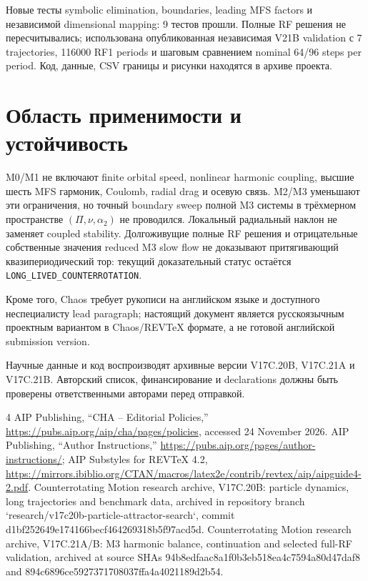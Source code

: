 \documentclass[aip,cha,reprint,amsmath,amssymb]{revtex4-2}
\begin{document}
Новые тесты symbolic elimination, boundaries, leading MFS factors и независимой dimensional mapping: 9 тестов прошли. Полные RF решения не пересчитывались; использована опубликованная независимая V21B validation с 7 trajectories, 116000 RF1 periods и шаговым сравнением nominal 64/96 steps per period. Код, данные, CSV границы и рисунки находятся в архиве проекта.

\section{Область применимости и устойчивость}
M0/M1 не включают finite orbital speed, nonlinear harmonic coupling, высшие шесть MFS гармоник, Coulomb, radial drag и осевую связь. M2/M3 уменьшают эти ограничения, но точный boundary sweep полной M3 системы в трёхмерном пространстве $(\Pi,\nu,\alpha_2)$ не проводился. Локальный радиальный наклон не заменяет coupled stability. Долгоживущие полные RF решения и отрицательные собственные значения reduced M3 slow flow не доказывают притягивающий квазипериодический тор: текущий доказательный статус остаётся \texttt{LONG\_LIVED\_COUNTERROTATION}.

Кроме того, Chaos требует рукописи на английском языке и доступного неспециалисту lead paragraph; настоящий документ является русскоязычным проектным вариантом в Chaos/REVTeX формате, а не готовой английской submission version.\cite{chaosguide,revtexguide,v20barchive,v21archive}

\begin{acknowledgments}
Научные данные и код воспроизводят архивные версии V17C.20B, V17C.21A и V17C.21B. Авторский список, финансирование и declarations должны быть проверены ответственными авторами перед отправкой.
\end{acknowledgments}

\begin{thebibliography}{4}
 AIP Publishing, ``CHA -- Editorial Policies,'' \url{https://pubs.aip.org/aip/cha/pages/policies}, accessed 24 November 2026.
 AIP Publishing, ``Author Instructions,'' \url{https://pubs.aip.org/pages/author-instructions/}; AIP Substyles for REVTeX 4.2, \url{https://mirrors.ibiblio.org/CTAN/macros/latex2e/contrib/revtex/aip/aipguide4-2.pdf}.
 Counterrotating Motion research archive, V17C.20B: particle dynamics, long trajectories and benchmark data, archived in repository branch `research/v17c20b-particle-attractor-search`, commit d1bf252649e174166becf464269318b5f97acd5d.
 Counterrotating Motion research archive, V17C.21A/B: M3 harmonic balance, continuation and selected full-RF validation, archived at source SHAs 94b8edfaac8a1f0b3eb518ea4c7594a80d47daf8 and 894c6896ce5927371708037ffa4a4021189d2b54.
\end{thebibliography}
\end{document}

